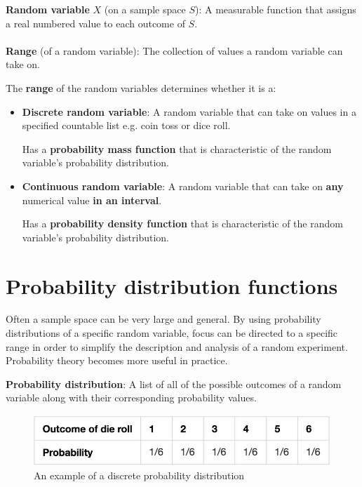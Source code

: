 \documentclass[10pt,a4paper]{article}
\begin{document}
\begin{tcolorbox}[breakable,colback=white]
\textbf{Random variable} $X$ (on a sample space $S$):  A measurable function that assigns a
real numbered value to each outcome of $S$.
\\
\\
\textbf{Range} (of a random variable): The collection of values a random variable can take on.
\end{tcolorbox}


The \textbf{range} of the random variables determines whether it is a:
\begin{itemize}
    \item \textbf{Discrete random variable}: A random variable that can take on values in a specified
    countable list e.g. coin toss or dice roll.

    Has a \textbf{probability mass function} that is characteristic of the random variable's probability distribution.
    \item \textbf{Continuous random variable}: A random variable that can take on \textbf{any}
    numerical value \textbf{in an interval}.

    Has a \textbf{probability density function} that is characteristic of the random variable's probability distribution.
\end{itemize}

\pagebreak
\section{Probability distribution functions}

Often a sample space can be very large and general. By using probability distributions of a specific random
variable, focus can be directed to a specific range in order to simplify the description and
analysis of a random experiment. Probability theory becomes more useful in practice.

\begin{tcolorbox}[breakable,colback=white]
\textbf{Probability distribution}: A list of all of the possible outcomes of a random variable along with their corresponding probability values.
\end{tcolorbox}

\begin{figure} [h!]
    \centering
    \includegraphics[scale=0.4]{Prob distribution.JPG}
    \caption{An example of a discrete probability distribution}
\end{figure}
\end{document}

